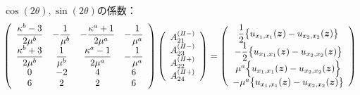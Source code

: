 $\cos(2\theta),\sin(2\theta)$の係数：
\begin{align}
	\left(
	\begin{array}{cccc}
		{\displaystyle\frac{ \kappa^b-3}{2\mu^{b}}}& {\displaystyle-\frac{1}{\mu^{b}}} &
		{\displaystyle-\frac{\kappa^a+1}{2\mu^{a}}} & {\displaystyle-\frac{1}{\mu^{a}}} \\
		{\displaystyle\frac{\kappa^b+3}{2\mu^{b}}} & {\displaystyle\frac{1}{\mu^{b}}} &
		{\displaystyle\frac{\kappa^a-1}{2\mu^{a}}} & {\displaystyle-\frac{1}{\mu^{a}}} \\
		0 & -2 & 4 & 6 \\
		6 & 2 & 2 & 6\\
	\end{array}
	\right)
	\left(
	\begin{array}{c}
		A_{21}^{(I\hspace{-.15em}I-)} \\
	 	A_{23}^{(I\hspace{-.15em}I-)} \\
		A_{22}^{(I\hspace{-.15em}I+)}\\
	 	A_{24}^{(I\hspace{-.15em}I+)} \\
	\end{array}
	\right)
	=
	\left(
	\begin{array}{c}
		{\displaystyle\frac{1}{2}\bigl\{u_{x_{1},x_{1}}(\bm{z})-u_{x_{2},x_{2}}(\bm{z})\bigr\}} \\
	 	{\displaystyle-\frac{1}{2}\bigl\{u_{x_{1},x_{1}}(\bm{z})-u_{x_{2},x_{2}}(\bm{z})\bigr\}} \\
		\mu^a\Bigl\{ u_{x_{1},x_{1}}(\bm{z})- u_{x_{2},x_{2}}(\bm{z})\Bigr\} \\
	 	-\mu^a \bigl\{u_{x_{1},x_{1}}(\bm{z})-u_{x_{2},x_{2}}(\bm{z})\bigr\} \\
	\end{array}
	\right)
\end{align}
